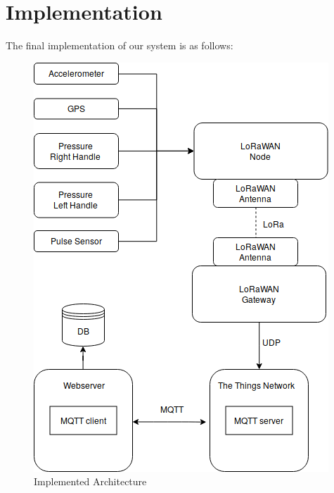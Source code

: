 \chapter{Implementation}
\label{cha:implementation}

The final implementation of our system is as follows:
\begin{figure}[h]
\centering
\includegraphics[width=1\linewidth]{gfx/architecture_implementation_h}
\caption{Implemented Architecture}
\label{fig:image2}
\end{figure}

